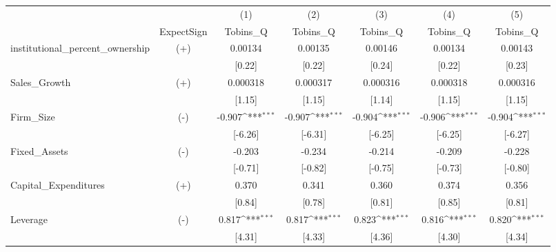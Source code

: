 {
\def\sym#1{\ifmmode^{#1}\else\(^{#1}\)\fi}
\begin{tabular}{lc*{5}{c}}
\hline\hline
            &            &\multicolumn{1}{c}{(1)}&\multicolumn{1}{c}{(2)}&\multicolumn{1}{c}{(3)}&\multicolumn{1}{c}{(4)}&\multicolumn{1}{c}{(5)}\\
            & ExpectSign &\multicolumn{1}{c}{Tobins\_Q}&\multicolumn{1}{c}{Tobins\_Q}&\multicolumn{1}{c}{Tobins\_Q}&\multicolumn{1}{c}{Tobins\_Q}&\multicolumn{1}{c}{Tobins\_Q}\\
\hline
institutional\_percent\_ownership&    (+)     &     0.00134         &     0.00135         &     0.00146         &     0.00134         &     0.00143         \\
            &            &      [0.22]         &      [0.22]         &      [0.24]         &      [0.22]         &      [0.23]         \\
[1em]
Sales\_Growth&    (+)     &    0.000318         &    0.000317         &    0.000316         &    0.000318         &    0.000316         \\
            &            &      [1.15]         &      [1.15]         &      [1.14]         &      [1.15]         &      [1.15]         \\
[1em]
Firm\_Size   &    (-)     &      -0.907\sym{***}&      -0.907\sym{***}&      -0.904\sym{***}&      -0.906\sym{***}&      -0.904\sym{***}\\
            &            &     [-6.26]         &     [-6.31]         &     [-6.25]         &     [-6.25]         &     [-6.27]         \\
[1em]
Fixed\_Assets&    (-)     &      -0.203         &      -0.234         &      -0.214         &      -0.209         &      -0.228         \\
            &            &     [-0.71]         &     [-0.82]         &     [-0.75]         &     [-0.73]         &     [-0.80]         \\
[1em]
Capital\_Expenditures&    (+)     &       0.370         &       0.341         &       0.360         &       0.374         &       0.356         \\
            &            &      [0.84]         &      [0.78]         &      [0.81]         &      [0.85]         &      [0.81]         \\
[1em]
Leverage    &    (-)     &       0.817\sym{***}&       0.817\sym{***}&       0.823\sym{***}&       0.816\sym{***}&       0.820\sym{***}\\
            &            &      [4.31]         &      [4.33]         &      [4.36]         &      [4.30]         &      [4.34]         \\

\end{tabular}}
